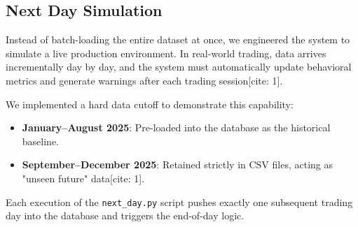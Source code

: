 \subsection{Next Day Simulation}
Instead of batch-loading the entire dataset at once, we engineered the system to simulate a live production environment. In real-world trading, data arrives incrementally day by day, and the system must automatically update behavioral metrics and generate warnings after each trading session[cite: 1].

We implemented a hard data cutoff to demonstrate this capability:
\begin{itemize}
    \item \textbf{January–August 2025}: Pre-loaded into the database as the historical baseline.
    \item \textbf{September–December 2025}: Retained strictly in CSV files, acting as "unseen future" data[cite: 1].
\end{itemize}

Each execution of the \texttt{next\_day.py} script pushes exactly one subsequent trading day into the database and triggers the end-of-day logic.

